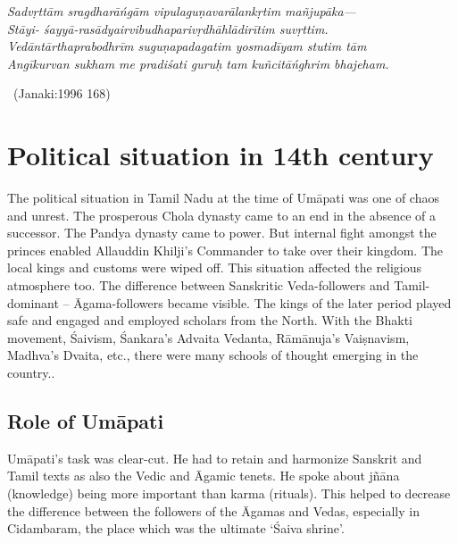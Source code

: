 \begin{myquote}
\textit{Sadvṛttām sragdharāńgām vipulaguṇavarālankṛtim mañjupāka—}\\\textit{Stāyi- śayyā-rasādyairvibudhaparivṛdhāhlādirītim suvṛttim.}\\\textit{Vedāntārthaprabodhrīm suguṇapadagatim yosmadīyam stutim tām}\\\textit{Angīkurvan sukham me pradiśati guruḥ tam kuñcitāńghrim bhajeham.}

~\hfill (Janaki:1996 168)
\end{myquote}

\newpage


\section*{Political situation in 14th century}

\vskip -4pt

The political situation in Tamil Nadu at the time of Umāpati was one of chaos and unrest. The prosperous Chola dynasty came to an end in the absence of a successor. The Pandya dynasty came to power. But internal fight amongst the princes enabled Allauddin Khilji’s Commander to take over their kingdom. The local kings and customs were wiped off. This situation affected the religious atmosphere too. The difference between Sanskritic Veda-followers and Tamil-dominant – Āgama-followers became visible. The kings of the later period played safe and engaged and employed scholars from the North. With the Bhakti movement, Śaivism, Śankara’s Advaita Vedanta, Rāmānuja’s Vaiṣnavism, Madhva’s Dvaita, etc., there were many schools of thought emerging in the country..

\subsection*{Role of Umāpati}

\vskip -4pt

Umāpati’s task was clear-cut. He had to retain and harmonize Sanskrit and Tamil texts as also the Vedic and Āgamic tenets. He spoke about jñāna (knowledge) being more important than karma (rituals). This helped to decrease the difference between the followers of the Āgamas and Vedas, especially in Cidambaram, the place which was the ultimate ‘Śaiva shrine’.

